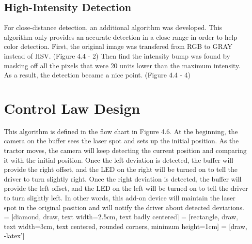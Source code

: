 \documentclass[letterpaper,12pt,oneside]{book}
\begin{document}
		\subsection{High-Intensity Detection}
		
		For close-distance detection, an additional algorithm was developed. This algorithm only  provides an accurate detection in a close range in order to help color detection. First, the original image was transfered from RGB to GRAY instead of HSV. (Figure 4.4 - 2) Then find the intensity bump was found by masking off all the pixels that were 20 units lower than the maximum intensity. As a result, the detection became a nice point. (Figure 4.4 - 4)
		
		\section{Control Law Design}
		This algorithm is defined in the flow chart in Figure 4.6. At the beginning, the camera on the buffer sees the laser spot and sets up the initial position. As the tractor moves, the camera will keep detecting the current position and comparing it with the initial position. Once the left deviation is detected, the buffer will provide the right offset, and the LED on the right will be turned on to tell the driver to turn slightly right. Once the right deviation is detected, the buffer will provide the left offset, and the LED on the left will be turned on to tell the driver to turn slightly left.  In other words, this add-on device will maintain the laser spot in the original position and will notify the driver about detected deviations. 
		 = [diamond, draw, text width=2.5cm, text badly centered]
		 = [rectangle, draw, text width=3cm, text centered, rounded corners, minimum height=1cm]
		 = [draw, -latex']
\end{document}
